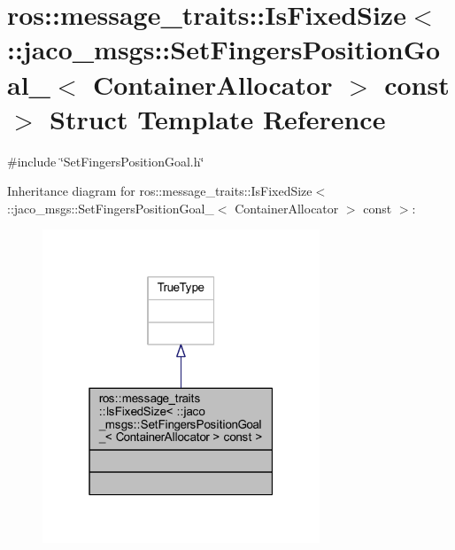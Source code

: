 \hypertarget{structros_1_1message__traits_1_1IsFixedSize_3_01_1_1jaco__msgs_1_1SetFingersPositionGoal___3_01Cf2cf2472bfaefa20713862ca5385107a}{}\section{ros\+:\+:message\+\_\+traits\+:\+:Is\+Fixed\+Size$<$ \+:\+:jaco\+\_\+msgs\+:\+:Set\+Fingers\+Position\+Goal\+\_\+$<$ Container\+Allocator $>$ const $>$ Struct Template Reference}
\label{structros_1_1message__traits_1_1IsFixedSize_3_01_1_1jaco__msgs_1_1SetFingersPositionGoal___3_01Cf2cf2472bfaefa20713862ca5385107a}


{\ttfamily \#include \char`\"{}Set\+Fingers\+Position\+Goal.\+h\char`\"{}}



Inheritance diagram for ros\+:\+:message\+\_\+traits\+:\+:Is\+Fixed\+Size$<$ \+:\+:jaco\+\_\+msgs\+:\+:Set\+Fingers\+Position\+Goal\+\_\+$<$ Container\+Allocator $>$ const $>$\+:
\nopagebreak
\begin{figure}[H]
\begin{center}
\leavevmode
\includegraphics[width=235pt]{dc/dd7/structros_1_1message__traits_1_1IsFixedSize_3_01_1_1jaco__msgs_1_1SetFingersPositionGoal___3_01C136bbec58fd4d7d1da7ee4fa4df90d46}
\end{center}
\end{figure}


